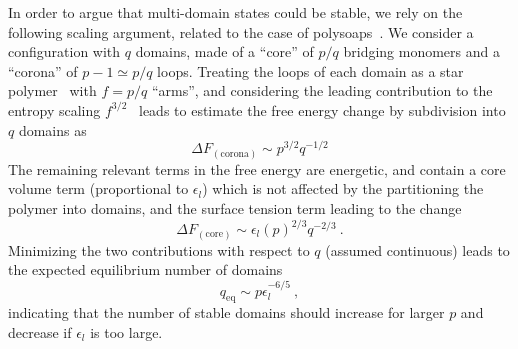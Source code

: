 \documentclass[
preprint,
a4paper,
12pt,
superscriptaddress,
pre]{revtex4}
\begin{document}
In order to argue that multi-domain states could be stable, we rely on
the following scaling argument, related to the case of
polysoaps~\citep{Borisov1997,Borisov1996}. We consider a configuration
with $q$ domains, made of a ``core'' of $p/q$ bridging monomers and a
``corona'' of $p-1\simeq p/q$ loops.  Treating the loops of each
domain as a star polymer~\cite{Borisov1997} with $f=p/q$ ``arms'', and
considering the leading contribution to the entropy scaling
$f^{3/2}$~\cite{Daoud1982} leads to estimate the free energy change by
subdivision into $q$ domains as
\begin{equation}
  \Delta F_\mathrm{(corona)} \sim p^{3/2}q^{-1/2}
 \label{eq:poly1}
\end{equation}
The remaining relevant terms in the free energy are energetic, and
contain a core volume term (proportional to $\epsilon_l$) which is not
affected by the partitioning the polymer into domains, and the surface
tension term leading to the change
\begin{equation}
  \Delta F_\mathrm{(core)} \sim \epsilon_l (p)^{2/3}q^{-2/3} \ .
 \label{eq:poly2}
\end{equation}
Minimizing the two contributions with respect to $q$ (assumed
continuous) leads to the expected equilibrium number of domains 
\begin{equation}
  q_{\mathrm{eq}} \sim p  \epsilon_l^{-6/5} \ ,
\end{equation}
indicating that the number of stable domains should increase for
larger $p$ and decrease if $\epsilon_l$ is too large. 
\end{document}
